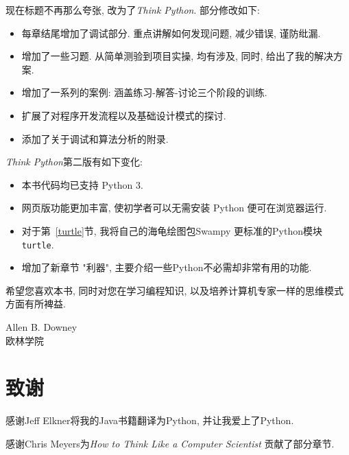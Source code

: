 \documentclass[10pt]{book}
\begin{document}
现在标题不再那么夸张, 改为了{\em Think Python}. 
部分修改如下:

\begin{itemize}

\item 每章结尾增加了调试部分. 
重点讲解如何发现问题, 减少错误, 谨防纰漏. 

\item 增加了一些习题. 从简单测验到项目实操, 
均有涉及, 同时, 给出了我的解决方案. 

\item 增加了一系列的案例: 涵盖练习-解答-讨论三个阶段的训练. 

\item 扩展了对程序开发流程以及基础设计模式的探讨. 

\item 添加了关于调试和算法分析的附录. 

\end{itemize}

{\em Think Python}第二版有如下变化: 

\begin{itemize}

\item 本书代码均已支持 Python 3.

\item 网页版功能更加丰富, 使初学者可以无需安装 Python 便可在浏览器运行. 

\item 对于第~\ref{turtle}节, 我将自己的海龟绘图包Swampy 更标准的Python模块{\tt turtle}. 

\item 增加了新章节 "利器", 主要介绍一些Python不必需却非常有用的功能. 

\end{itemize}

希望您喜欢本书, 同时对您在学习编程知识, 以及培养计算机专家一样的思维模式
方面有所裨益. 



Allen B. Downey \\

欧林学院 \\


\section*{致谢}

感谢Jeff Elkner将我的Java书籍翻译为Python, 
并让我爱上了Python.

感谢Chris Meyers为{\em How to Think Like a Computer Scientist}
贡献了部分章节. 
\end{document}
